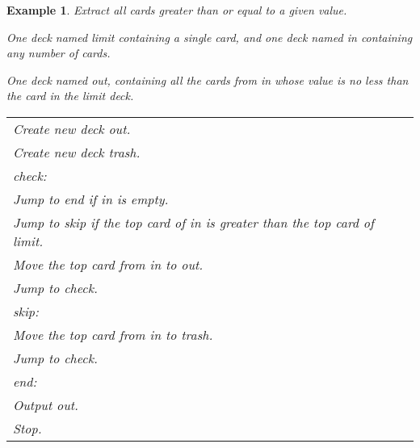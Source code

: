 \documentclass[a4paper,twoside]{tufte-handout}
\newtheorem{example}{Example}
\newcommand\lbl[1]{\hspace{-1em}\emph{#1:}}
\begin{document}
\begin{example}
  Extract all cards greater than or equal to a given value.
  \begin{description}
  \item[Input:] One deck named \emph{limit} containing a single card,
    and one deck named \emph{in} containing any number of cards.
  \item[Output:] One deck named \emph{out}, containing all the cards
    from \emph{in} whose value is no less than the card in the
    \emph{limit} deck.
 \item[Algorithm:]
  \item\normalfont
    \begin{tabular}{l}
      Create new deck \emph{out}.\\
      Create new deck \emph{trash}.\\
      \lbl{check}\\
      Jump to \emph{end} if \emph{in} is empty.\\
      Jump to \emph{skip} if the top card of \emph{in} is greater than
      the top card of \emph{limit}.\\
      Move the top card from \emph{in} to \emph{out}.\\
      Jump to \emph{check}.\\
      \lbl{skip}\\
      Move the top card from \emph{in} to \emph{trash}.\\
      Jump to \emph{check}.\\
      \lbl{end}\\
      Output \emph{out}.\\
      Stop.
    \end{tabular}
  \end{description}
\end{example}
\end{document}
